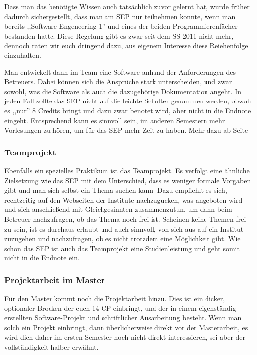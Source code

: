 Dass man das benötigte Wissen auch tatsächlich zuvor gelernt hat,
wurde früher dadurch sichergestellt, dass man am SEP nur teilnehmen 
konnte, wenn man bereits ,,Software Engeneering 1'' und eines der 
beiden Programmierenfächer bestanden hatte. Diese Regelung gibt 
es zwar seit dem SS 2011 nicht mehr, dennoch raten wir euch dringend 
dazu, aus eigenem Interesse diese Reiehenfolge einzuhalten.

Man entwickelt dann im Team eine Software anhand der Anforderungen des
Betreuers. Dabei können sich die Ansprüche stark unterscheiden, und
zwar sowohl, was die Software als auch die dazugehörige Dokumentation
angeht. In jeden Fall sollte das SEP nicht auf die leichte Schulter
genommen werden, obwohl es ,,nur'' 8 Credits bringt und dazu zwar
benotet wird, aber nicht in die Endnote eingeht. Entsprechend kann es
sinnvoll sein, im anderen Semestern mehr Vorlesungen zu hören, um für
das SEP mehr Zeit zu haben. Mehr dazu ab Seite \pageref{bach_studienplan}

\subsubsection*{Teamprojekt}
Ebenfalls ein spezielles Praktikum ist das Teamprojekt. Es verfolgt
eine ähnliche Zielsetzung wie das SEP mit dem Unterschied, dass es
weniger formale Vorgaben gibt und man sich selbst ein Thema suchen
kann. Dazu empfiehlt es sich, rechtzeitig auf den Webseiten der
Institute nachzugucken, was angeboten wird und sich anschließend mit
Gleichgesinnten zusammenzutun, um dann beim Betreuer nachzufragen, ob
das Thema noch frei ist. Scheinen keine Themen frei zu sein, ist es
durchaus erlaubt und auch sinnvoll, von sich aus auf ein Institut
zuzugehen und nachzufragen, ob es nicht trotzdem eine Möglichkeit
gibt. Wie schon das SEP ist auch das Teamprojekt eine Studienleistung
und geht somit nicht in die Endnote ein.

\subsubsection*{Projektarbeit im Master}
Für den Master kommt noch die Projektarbeit hinzu. Dies ist ein dicker, 
optionaler Brocken der euch 14 CP einbringt, und der in einem eigenständig 
erstellten Software-Projekt und schriftlicher Ausarbeitung besteht. 
Wenn man solch ein Projekt einbringt, dann überlicherweise direkt vor der 
Masterarbeit, es wird dich daher im ersten Semester noch nicht direkt 
interessieren, sei aber der vollständigkeit halber erwähnt.


